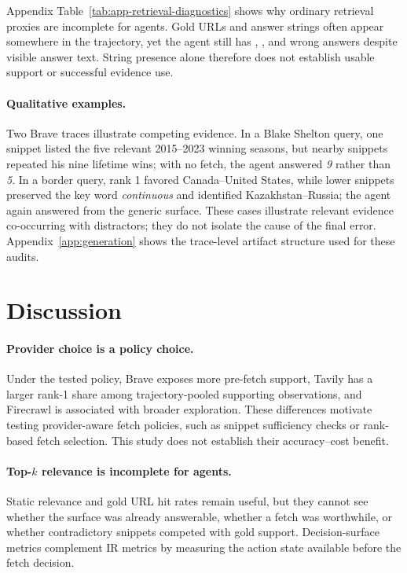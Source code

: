 Appendix Table~\ref{tab:app-retrieval-diagnostics} shows why ordinary retrieval proxies are incomplete for agents. Gold URLs and answer strings often appear somewhere in the trajectory, yet the agent still has \BraveWrongWithAnswer{}, \TavilyWrongWithAnswer{}, and \FirecrawlWrongWithAnswer{} wrong answers despite visible answer text. String presence alone therefore does not establish usable support or successful evidence use.

\paragraph{Qualitative examples.}
Two Brave traces illustrate competing evidence. In a Blake Shelton query, one snippet listed the five relevant 2015--2023 winning seasons, but nearby snippets repeated his nine lifetime wins; with no fetch, the agent answered \emph{9} rather than \emph{5}. In a border query, rank 1 favored Canada--United States, while lower snippets preserved the key word \emph{continuous} and identified Kazakhstan--Russia; the agent again answered from the generic surface. These cases illustrate relevant evidence co-occurring with distractors; they do not isolate the cause of the final error. Appendix~\ref{app:generation} shows the trace-level artifact structure used for these audits.

\section{Discussion}
\label{sec:discussion}

\paragraph{Provider choice is a policy choice.}
Under the tested policy, Brave exposes more pre-fetch support, Tavily has a larger rank-1 share among trajectory-pooled supporting observations, and Firecrawl is associated with broader exploration. These differences motivate testing provider-aware fetch policies, such as snippet sufficiency checks or rank-based fetch selection. This study does not establish their accuracy--cost benefit.

\paragraph{Top-$k$ relevance is incomplete for agents.}
Static relevance and gold URL hit rates remain useful, but they cannot see whether the surface was already answerable, whether a fetch was worthwhile, or whether contradictory snippets competed with gold support. Decision-surface metrics complement IR metrics by measuring the action state available before the fetch decision.

